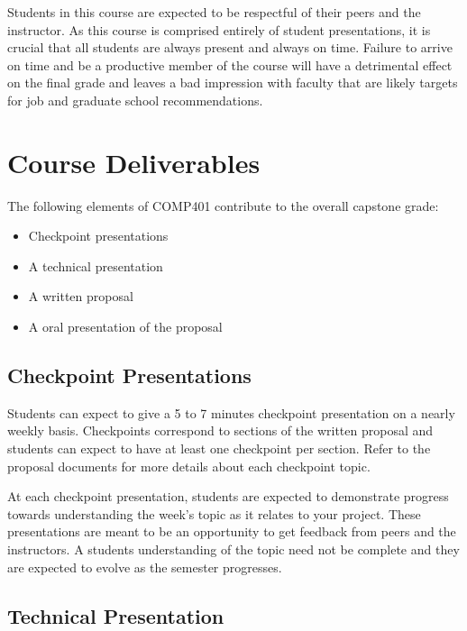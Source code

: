 \documentclass[nobib]{tufte-handout}
\begin{document}
Students in this course are expected to be respectful of their peers and the instructor. As this course is comprised entirely of student presentations, it is crucial that all students are always present and always on time.  Failure to arrive on time and be a productive member of the course will have a detrimental effect on the final grade and leaves a bad impression with faculty that are likely targets for job and graduate school recommendations.

\section{Course Deliverables}

The following elements of COMP401 contribute to the overall capstone grade:
\begin{itemize}
\item Checkpoint presentations
\item A technical presentation
\item A written proposal
\item A oral presentation of the proposal
\end{itemize}


\subsection{Checkpoint Presentations}

Students can expect to give a 5 to 7 minutes checkpoint presentation on a nearly weekly basis. Checkpoints correspond to sections of the written proposal and students can expect to have at least one checkpoint per section. Refer to the proposal documents for more details about each checkpoint topic.

At each checkpoint presentation, students are expected to demonstrate progress towards understanding the week's topic as it relates to your project.  These presentations are meant to be an opportunity to get feedback from peers and the instructors.  A students understanding of the topic need not be complete and they are expected to evolve as the semester progresses.

\subsection{Technical Presentation}
\end{document}
